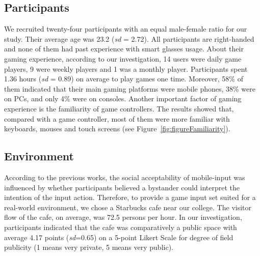 \documentclass{sigchi}
\begin{document}
  \subsection {Participants}
  We recruited twenty-four participants with an equal male-female ratio for our study. Their average age was 23.2 (\textsl{sd} = 2.72). All participants are right-handed and none of them had past experience with smart glasses usage. About their gaming experience, according to our investigation, 14 users were daily game players, 9 were weekly players and 1 was a monthly player. Participants spent 1.36 hours (\textsl{sd} = 0.89) on average to play games one time. Moreover, 58\% of them indicated that their main gaming platforms were mobile phones, 38\% were on PCs, and only 4\% were on consoles. Another important factor of gaming experience is the familiarity of game controllers. The results showed that, compared with a game controller, most of them were more familiar with keyboards, mouses and touch screens (see Figure~\ref{fig:figureFamiliarity}).
 

  \subsection {Environment}
  According to the previous works\cite{Wiliamson:2011:MMI:2070481.2070551,Williamson:2013:MEM:2522848.2522874,Montero:2010:YUS:1851600.1851647,Rico:2010:UGM:1753326.1753458}, the social acceptability of mobile-input was influenced by whether participants believed a bystander could interpret the intention of the input action. Therefore, to provide a game input set suited for a real-world environment, we chose a Starbucks cafe near our college. The visitor flow of the cafe, on average, was 72.5 persons per hour. In our investigation, participants indicated that the cafe was comparatively a public space with average 4.17 points (\textsl{sd}=0.65) on a 5-point Likert Scale for degree of field publicity (1 means very private, 5 means very public).    
\end{document}
